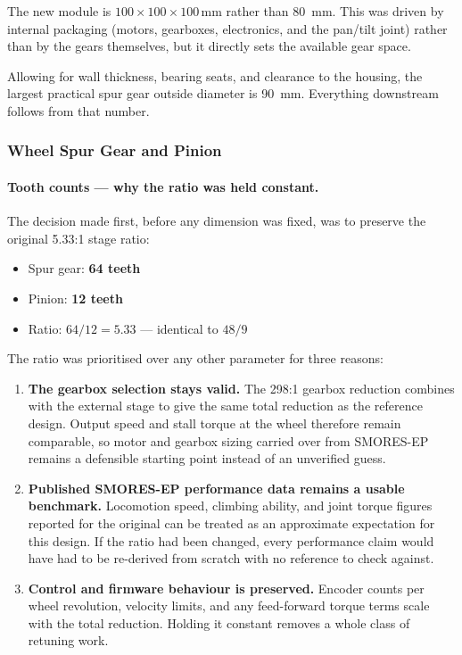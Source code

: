 \documentclass[12pt,a4paper]{article}
\begin{document}
The new module is $100 \times 100 \times 100$\,mm rather than
\SI{80}{\milli\metre}. This was driven by internal packaging (motors,
gearboxes, electronics, and the pan/tilt joint) rather than by the gears
themselves, but it directly sets the available gear space.

Allowing for wall thickness, bearing seats, and clearance to the housing, the
largest practical spur gear outside diameter is \SI{90}{\milli\metre}.
Everything downstream follows from that number.

\subsubsection{Wheel Spur Gear and Pinion}

\paragraph{Tooth counts --- why the ratio was held constant.}
The decision made first, before any dimension was fixed, was to preserve the
original \num{5.33}:1 stage ratio:
\begin{itemize}
	\item Spur gear: \textbf{64 teeth}
	\item Pinion: \textbf{12 teeth}
	\item Ratio: $64/12 = 5.33$ --- identical to $48/9$
\end{itemize}

The ratio was prioritised over any other parameter for three reasons:
\begin{enumerate}
	\item \textbf{The gearbox selection stays valid.} The 298:1 gearbox
	      reduction combines with the external stage to give the same total
	      reduction as the reference design. Output speed and stall torque at
	      the wheel therefore remain comparable, so motor and gearbox sizing
	      carried over from SMORES-EP remains a defensible starting point
	      instead of an unverified guess.
	\item \textbf{Published SMORES-EP performance data remains a usable
	      benchmark.} Locomotion speed, climbing ability, and joint torque
	      figures reported for the original can be treated as an approximate
	      expectation for this design. If the ratio had been changed, every
	      performance claim would have had to be re-derived from scratch with
	      no reference to check against.
	\item \textbf{Control and firmware behaviour is preserved.} Encoder counts
	      per wheel revolution, velocity limits, and any feed-forward torque
	      terms scale with the total reduction. Holding it constant removes a
	      whole class of retuning work.
\end{enumerate}
\end{document}
